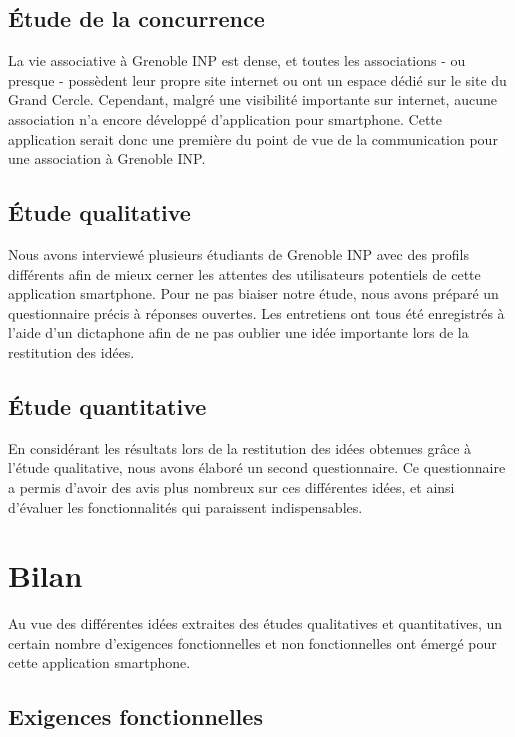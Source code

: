\documentclass[a4paper, 11px]{article}
\begin{document}
\subsection{Étude de la concurrence}
La vie associative à Grenoble INP est dense, et toutes les associations - ou presque - possèdent leur propre site internet ou ont un espace dédié sur le site du Grand Cercle.
Cependant, malgré une visibilité importante sur internet, aucune association n'a encore développé d'application pour smartphone. Cette application serait donc une première du point de vue de la communication pour une association à Grenoble INP.

\subsection{Étude qualitative}
Nous avons interviewé plusieurs étudiants de Grenoble INP avec des profils différents afin de mieux cerner les attentes des utilisateurs potentiels de cette application smartphone. Pour ne pas biaiser notre étude, nous avons préparé un questionnaire précis à réponses ouvertes.
Les entretiens ont tous été enregistrés à l'aide d'un dictaphone afin de ne pas oublier une idée importante lors de la restitution des idées. 

\subsection{Étude quantitative}
En considérant les résultats lors de la restitution des idées obtenues grâce à l'étude qualitative, nous avons élaboré un second questionnaire. Ce questionnaire a permis d'avoir des avis plus nombreux sur ces différentes idées, et ainsi d'évaluer les fonctionnalités qui paraissent indispensables.

\newpage

\section{Bilan}
Au vue des différentes idées extraites des études qualitatives et quantitatives, un certain nombre d'exigences fonctionnelles et non fonctionnelles ont émergé pour cette application smartphone.

\subsection{Exigences fonctionnelles}
\end{document}
